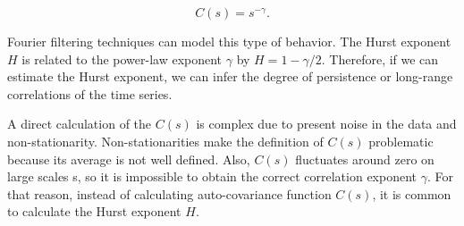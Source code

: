  $$C(s) = s^{-\gamma}.$$
 
Fourier filtering techniques can model this type of behavior. The Hurst exponent $H$ is related to the power-law exponent $\gamma$ by $H=1-\gamma/2$. Therefore, if we can estimate the Hurst exponent, we can infer the degree of persistence or long-range correlations of the time series.







A direct calculation of the $C(s)$ is complex due to present noise in the data and non-stationarity. Non-stationarities make the definition of $C(s)$ problematic because its average is not well defined. Also, $C(s)$ fluctuates around zero on large scales s, so it is impossible to obtain the correct correlation exponent $\gamma$. For that reason, instead of calculating auto-covariance function $C(s)$, it is common to calculate the Hurst exponent $H$.

